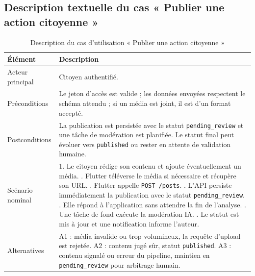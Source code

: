 \label{fig:r1_s2_uc}

\subsection{Description textuelle du cas « Publier une action citoyenne »}

\begin{longtable}{|p{3.2cm}|p{10.2cm}|}
\caption{Description du cas d'utilisation « Publier une action citoyenne »}\label{tab:r1_uc_post}\\
\hline\rowcolor{gray!20}\textbf{Élément} & \textbf{Description}\\\hline
Acteur principal & Citoyen authentifié.\\\hline
Préconditions & Le jeton d'accès est valide ; les données envoyées respectent le schéma attendu ; si un média est joint, il est d'un format accepté.\\\hline
Postconditions & La publication est persistée avec le statut \texttt{pending\_review} et une tâche de modération est planifiée. Le statut final peut évoluer vers \texttt{published} ou rester en attente de validation humaine.\\\hline
Scénario nominal & 1. Le citoyen rédige son contenu et ajoute éventuellement un média. \newline 2. Flutter téléverse le média si nécessaire et récupère son URL. \newline 3. Flutter appelle \texttt{POST /posts}. \newline 4. L'API persiste immédiatement la publication avec le statut \texttt{pending\_review}. \newline 5. Elle répond à l'application sans attendre la fin de l'analyse. \newline 6. Une tâche de fond exécute la modération IA. \newline 7. Le statut est mis à jour et une notification informe l'auteur.\\\hline
Alternatives & A1 : média invalide ou trop volumineux, la requête d'upload est rejetée. \newline A2 : contenu jugé sûr, statut \texttt{published}. \newline A3 : contenu signalé ou erreur du pipeline, maintien en \texttt{pending\_review} pour arbitrage humain.\\\hline
\end{longtable}

